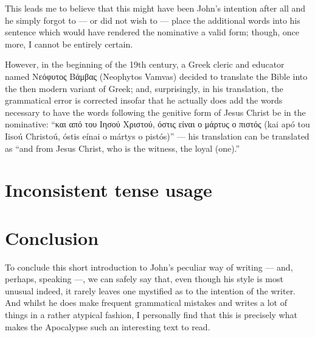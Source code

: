This leads me to believe that this might have been John’s intention after all and he simply forgot to — or did not wish to — place the additional words into his sentence which would have rendered the nominative a valid form; though, once more, I cannot be entirely certain.

However, in the beginning of the 19th century, a Greek cleric and educator named Νεόφυτος Βάμβας (Neophytos Vamvas) decided to translate the Bible into the then modern variant of Greek; and, surprisingly, in his translation, the grammatical error is corrected insofar that he actually does add the words necessary to have the words following the genitive form of Jesus Christ be in the nominative: “και από του Ιησού Χριστού, όστις είναι ο μάρτυς ο πιστός (kai apó tou Iisoú Christoú, óstis eínai o mártys o pistós)” — his translation can be translated as “and from Jesus Christ, who is the witness, the loyal (one).”

\section*{Inconsistent tense usage}

\section*{Conclusion}
  
To conclude this short introduction to John's peculiar way of writing — and, perhaps, speaking —, we can safely say that, even though his style is most unusual indeed, it rarely leaves one mystified as to the intention of the writer. And whilst he does make frequent grammatical mistakes and writes a lot of things in a rather atypical fashion, I personally find that this is precisely what makes the Apocalypse such an interesting text to read.


  
